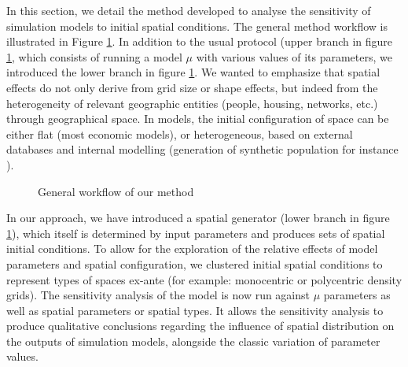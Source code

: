 \documentclass[Royal,sageh,times]{sagej}
\begin{document}
In this section, we detail the method developed to analyse the sensitivity of simulation models to initial spatial conditions. The general method workflow is illustrated in Figure \ref{fig:method}. In addition to the usual protocol (upper branch in figure \ref{fig:method}, which consists of running a model $\mu$ with various values of its parameters, we introduced the lower branch in figure \ref{fig:method}. We wanted to emphasize that spatial effects do not only derive from grid size or shape effects, but indeed from the heterogeneity of relevant geographic entities (people, housing, networks, etc.) through geographical space. In models, the initial configuration of space can be either flat (most economic models), or heterogeneous,  based on external databases and internal modelling (generation of synthetic population for instance \citep{bhat1999activity}).
\begin{figure}[htbp] \begin{center} 
 \caption{General workflow of our method} \label{fig:method} \end{center} \end{figure} %

In our approach, we have introduced a spatial generator (lower branch in figure \ref{fig:method}), which itself is determined by input parameters and produces sets of spatial initial conditions. 
To allow for the exploration of the relative effects of model parameters and spatial configuration, we clustered initial spatial conditions  to represent types of spaces ex-ante (for example: monocentric or polycentric density grids). The sensitivity analysis of the model is now run against $\mu$ parameters as well as spatial parameters or spatial types. It allows the sensitivity analysis to produce qualitative conclusions regarding the influence of spatial distribution on the outputs of simulation models, alongside the classic variation of parameter values.
\end{document}
